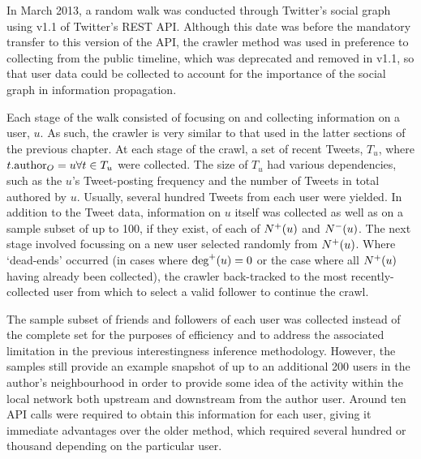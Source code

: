 In March 2013, a random walk was conducted through Twitter's social graph using v1.1 of Twitter's REST API. Although this date was before the mandatory transfer to this version of the API, the crawler method was used in preference to collecting from the public timeline, which was deprecated and removed in v1.1, so that user data could be collected to account for the importance of the social graph in information propagation.

Each stage of the walk consisted of focusing on and collecting information on a user, $u$. As such, the crawler is very similar to that used in the latter sections of the previous chapter. At each stage of the crawl, a set of recent Tweets, $T_u$, where $t.\textrm{author}_O = u \forall t \in T_u$ were collected. The size of $T_u$ had various dependencies, such as the $u$'s Tweet-posting frequency and the number of Tweets in total authored by $u$. Usually, several hundred Tweets from each user were yielded. In addition to the Tweet data, information on $u$ itself was collected as well as on a sample subset of up to 100, if they exist, of each of $N^+(u)$ and $N^-(u)$. The next stage involved focussing on a new user selected randomly from $N^+(u)$. Where `dead-ends' occurred (in cases where $\textrm{deg}^+(u) = 0$ or the case where all $N^+(u)$ having already been collected), the crawler back-tracked to the most recently-collected user from which to select a valid follower to continue the crawl.

The sample subset of friends and followers of each user was collected instead of the complete set for the purposes of efficiency and to address the associated limitation in the previous interestingness inference methodology. However, the samples still provide an example snapshot of up to an additional 200 users in the author's neighbourhood in order to provide some idea of the activity within the local network both upstream and downstream from the author user. Around ten API calls were required to obtain this information for each user, giving it immediate advantages over the older method, which required several hundred or thousand depending on the particular user. 

